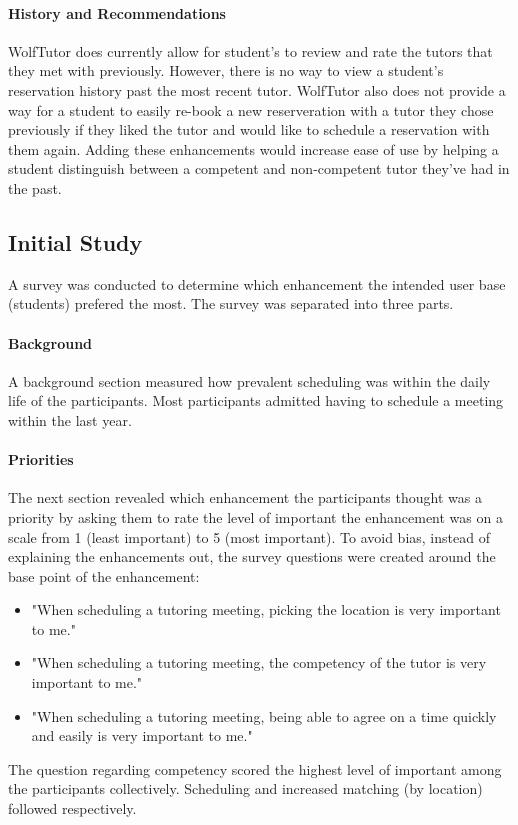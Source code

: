 \paragraph{History and Recommendations}
WolfTutor does currently allow for student's to review and rate the tutors that they met with previously. However, there is no way to view a student's reservation history past the most recent tutor. WolfTutor also does not provide a way for a student to easily re-book a new reserveration with a tutor they chose previously if they liked the tutor and would like to schedule a reservation with them again. Adding these enhancements would increase ease of use by helping a student distinguish between a competent and non-competent tutor they've had in the past. 

\subsection{Initial Study}
\label{sec:initial-study}
A survey was conducted to determine which enhancement the intended user base (students) prefered the most. The survey was separated into three parts. 

\paragraph{Background}
A background section measured how prevalent scheduling was within the daily life of the participants. Most participants admitted having to schedule a meeting within the last year. 

\paragraph{Priorities}
The next section revealed which enhancement the participants thought was a priority by asking them to rate the level of important the enhancement was on a scale from 1 (least important) to 5 (most important). To avoid bias, instead of explaining the enhancements out, the survey questions were created around the base point of the enhancement:
\begin{itemize}
  \item "When scheduling a tutoring meeting, picking the location is very important to me."
  \item "When scheduling a tutoring meeting, the competency of the tutor is very important to me."
  \item "When scheduling a tutoring meeting, being able to agree on a time quickly and easily is very important to me."
\end{itemize}
The question regarding competency scored the highest level of important among the participants collectively. Scheduling and increased matching (by location) followed respectively.

